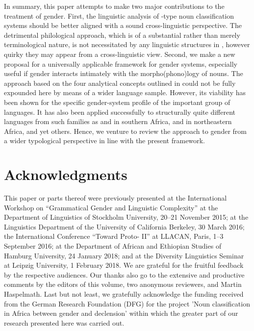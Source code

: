 \documentclass[output=collectionpaper]{langsci/langscibook}
\begin{document}
In summary, this paper attempts to make two major contributions to the treatment of gender. First, the linguistic analysis of -type noun classification systems should be better aligned with a sound cross-linguistic perspective. The detrimental philological approach, which is of a substantial rather than merely terminological nature, is not necessitated by any linguistic structures in , however quirky they may appear from a cross-linguistic view. Second, we make a new proposal for a universally applicable framework for gender systems, especially useful if gender interacts intimately with the morpho(phono)logy of nouns. The approach based on the four analytical concepts outlined in  could not be fully expounded here by means of a wider language sample. However, its viability has been shown for the specific gender-system profile of the important group of  languages. It has also been applied successfully to structurally quite different languages from such families as  and  in southern Africa,  and  in northeastern Africa, and yet others. Hence, we venture to review the approach to gender from a wider typological perspective in line with the present framework.


\section*{Acknowledgments}
This paper or parts thereof were previously presented at the International Workshop on ``Grammatical Gender and Linguistic Complexity'' at the Department of Linguistics of Stockholm University, 20--21 November 2015; at the Linguistics Department of the University of California Berkeley, 30 March 2016; the International Conference ``Toward Proto- II'' at LLACAN, Paris, 1--3 September 2016; at the Department of African and Ethiopian Studies of Hamburg University, 24 January 2018; and at the  Diversity Linguistics Seminar at Leipzig University, 1 February 2018. We are grateful for the fruitful feedback by the respective audiences. Our thanks also go to the extensive and productive comments by the editors of this volume, two anonymous reviewers, and Martin Haspelmath. Last but not least, we gratefully acknowledge the funding received from the German Research Foundation (DFG) for the project 'Noun classification in Africa between gender and declension' within which the greater part of our research presented here was carried out.
\end{document}
